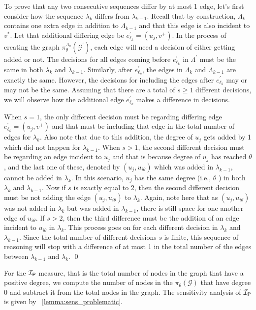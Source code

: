 {To prove that any two consecutive sequences differ by at most 1 edge, let's first consider how the sequence $\lambda_k$ differs from $\lambda_{k-1}$. Recall that by construction, $\Lambda_k$ contains one extra edge in addition to $\Lambda_{k-1}$ and that this edge is also incident to $v^*$. Let that additional differing edge be $e_{\ell_k}^\prime = (u_j, v^+)$. In the process of creating the graph $\pi_\theta^{\Lambda_k}(\mathcal{G}^{\prime})$, each edge will need a decision of either getting added or not. The decisions for all edges coming before $e_{\ell_k}^{\prime}$ in $\Lambda^{\prime}$ must be the same in both $\lambda_k$ and $\lambda_{k-1}$. Similarly, after $e_{\ell_k}^{\prime}$, the edges in $\Lambda_k$ and $\Lambda_{k-1}$ are exactly the same. However, the decisions for including the edges after $e_{\ell_k}^{\prime}$ may or may not be the same. Assuming that there are a total of $s \geq 1$ different decisions, we will observe how the additional edge $e_{\ell_k}^{\prime}$ makes a difference in decisions. 


When $s=1$, the only different decision must be regarding differing edge $e_{\ell_k}^\prime = (u_j, v^+)$ and that must be including that edge in the total number of edges for $\lambda_k$. Also note that due to this addition, the degree of $u_j$ gets added by 1 which did not happen for $\lambda_{k-1}$. When $s>1$, the second different decision must be regarding an edge incident to $u_j$ and that is because degree of $u_j$ has reached $\theta$, and the last one of these, denoted by $(u_j, u_{i \theta})$ which was added in $\lambda_{k-1}$, cannot be added in $\lambda_k$. In this scenario, $u_j$ has the same degree (i.e., $\theta$ ) in both $\lambda_k$ and $\lambda_{k-1}$. Now if $s$ is exactly equal to 2, then the second different decision must be not adding the edge $(u_j, u_{i \theta})$ to $\lambda_k$. Again, note here that as $(u_j, u_{i \theta})$ was not added in $\lambda_k$ but was added in $\lambda_{k-1}$, there is still space for one another edge of $u_{i \theta}$. If $s>2$, then the third difference must be the addition of an edge incident to $u_{i \theta}$ in $\lambda_k$. This process goes on for each different decision in $\lambda_k$ and $\lambda_{k-1}$. Since the total number of different decisions $s$ is finite, this sequence of reasoning will stop with a difference of at most 1 in the total number of the edges between $\lambda_{k-1}$ and $\lambda_k$.
\qed
\fi

For the $\mathcal{I_\mathsf{P}}$ measure, that is the total number of nodes in the graph that have a positive degree, we compute the number of nodes in the $\pi_\theta(\mathcal{G})$ that have degree 0 and subtract it from the total nodes in the graph. The sensitivity analysis of $\mathcal{I_\mathsf{P}}$ is given by ~\cref{lemma:sens_problematic}. 

}
